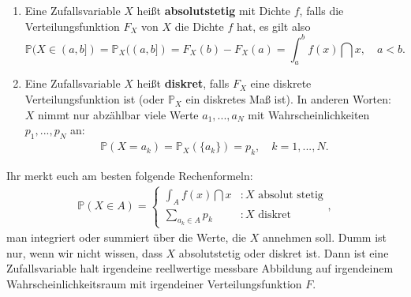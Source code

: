 \begin{deff}
	\begin{enumerate}[label=(\roman*)]
		\item Eine Zufallsvariable $X$ heißt \textbf{absolutstetig} mit Dichte $f$, falls die Verteilungsfunktion $F_X$ von $X$ die Dichte $f$ hat, es gilt also
		\[ \mathbb{P}(X \in (a,b] ) =\mathbb P_X((a,b])= F_X(b) - F_X(a) = \int_{a}^{b} f(x) \dint x, \quad a<b. \]
		\item Eine Zufallsvariable $X$ heißt \textbf{diskret}, falls $F_X$ eine diskrete Verteilungsfunktion ist (oder $\mathbb P_X$ ein diskretes Ma\ss{} ist). In anderen Worten: $X$ nimmt nur abz\"ahlbar viele Werte $a_1,...,a_N$ mit Wahrscheinlichkeiten $p_1,...,p_N$ an:
			\begin{align*}
		 \mathbb{P}( X = a_k )=\mathbb P_X(\{a_k\})= p_k,\quad k=1,...,N.
		\end{align*}
	\end{enumerate}
\end{deff}
Ihr merkt euch am besten folgende Rechenformeln:
\begin{align*}
	\mathbb P(X\in A)=\begin{cases}
		\int_A f(x)\dint x&: X\text{ absolut stetig}\\
		\sum_{a_k\in A} p_k&: X\text{ diskret}
	\end{cases},
\end{align*}
man integriert oder summiert \"uber die Werte, die $X$ annehmen soll. Dumm ist nur, wenn wir nicht wissen, dass $X$ absolutstetig oder diskret ist. Dann ist eine Zufallsvariable halt irgendeine reellwertige messbare Abbildung auf irgendeinem Wahrscheinlichkeitsraum mit irgendeiner Verteilungsfunktion $F$.

